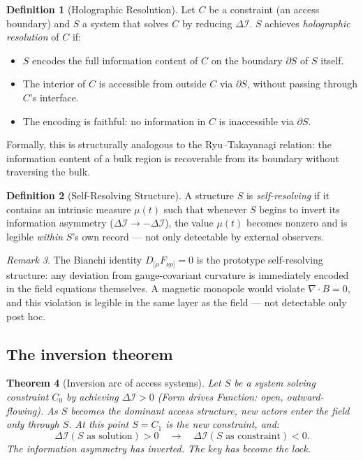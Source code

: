 \documentclass[12pt,a4paper]{article}
\theoremstyle{plain}
\newtheorem{theorem}{Theorem}[section]
\theoremstyle{definition}
\newtheorem{definition}[theorem]{Definition}
\theoremstyle{remark}
\newtheorem{remark}[theorem]{Remark}
\newcommand{\DI}{\Delta\mathcal{I}}
\begin{document}
\begin{definition}[Holographic Resolution]\label{def:holo}
Let $C$ be a constraint (an access boundary) and $S$ a system that solves $C$ 
by reducing $\DI$.  $S$ achieves \emph{holographic resolution} of $C$ if:
\begin{itemize}[noitemsep]
  \item[(HR-1)] $S$ encodes the full information content of $C$ on the boundary $\partial S$ 
    of $S$ itself.
  \item[(HR-2)] The interior of $C$ is accessible from outside $C$ 
    via $\partial S$, without passing through $C$'s interface.
  \item[(HR-3)] The encoding is faithful: no information in $C$ is 
    inaccessible via $\partial S$.
\end{itemize}
Formally, this is structurally analogous to the Ryu--Takayanagi relation: the 
information content of a bulk region is recoverable from its boundary 
without traversing the bulk.
\end{definition}

\begin{definition}[Self-Resolving Structure]\label{def:self-resolving}
A structure $S$ is \emph{self-resolving} if it contains an intrinsic 
measure $\mu(t)$ such that whenever $S$ begins to invert its information 
asymmetry ($\DI \to -\DI$), the value $\mu(t)$ becomes nonzero and 
is legible \emph{within} $S$'s own record --- not only detectable by 
external observers.
\end{definition}

\begin{remark}
The Bianchi identity $D_{[\mu}F_{\nu\rho]} = 0$ is the prototype 
self-resolving structure: any deviation from gauge-covariant curvature 
is immediately encoded in the field equations themselves.  
A magnetic monopole would violate $\nabla \cdot B = 0$, and this 
violation is legible in the same layer as the field --- not 
detectable only post hoc.
\end{remark}

\subsection{The inversion theorem}

\begin{theorem}[Inversion arc of access systems]\label{thm:inversion}
Let $S$ be a system solving constraint $C_0$ by achieving $\DI > 0$ 
(Form drives Function: open, outward-flowing).  As $S$ becomes the 
dominant access structure, new actors enter the field only through $S$.  
At this point $S = C_1$ is the new constraint, and:
\begin{equation}
  \DI(S\text{ as solution}) > 0 \quad\longrightarrow\quad 
  \DI(S\text{ as constraint}) < 0.
\end{equation}
The information asymmetry has inverted.  The key has become the lock.
\end{theorem}
\end{document}
